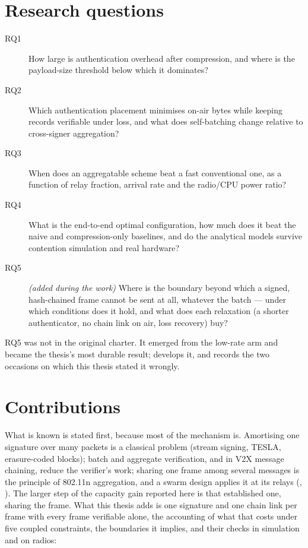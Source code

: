 \section{Research questions}

\begin{description}
\item[RQ1] How large is authentication overhead after compression, and where is the payload-size
      threshold below which it dominates?
\item[RQ2] Which authentication placement minimises on-air bytes while keeping records verifiable
      under loss, and what does self-batching change relative to cross-signer aggregation?
\item[RQ3] When does an aggregatable scheme beat a fast conventional one, as a function of relay
      fraction, arrival rate and the radio/CPU power ratio?
\item[RQ4] What is the end-to-end optimal configuration, how much does it beat the naive and
      compression-only baselines, and do the analytical models survive contention simulation and
      real hardware?
\item[RQ5] \emph{(added during the work)} Where is the boundary beyond which a signed,
      hash-chained frame cannot be sent at all, whatever the batch --- under which conditions
      does it hold, and what does each relaxation (a shorter authenticator, no chain link on
      air, loss recovery) buy?
\end{description}

RQ5 was not in the original charter. It emerged from the low-rate arm and became the thesis's most
durable result;  develops it, and records the two occasions on which this thesis
stated it wrongly.

\section{Contributions}

What is known is stated first, because most of the mechanism is. Amortising one signature over
many packets is a classical problem (stream signing, TESLA, erasure-coded blocks); batch and
aggregate verification, and in V2X message chaining, reduce the verifier's work; sharing one frame
among several messages is the principle of 802.11n aggregation, and a swarm design applies it at
its relays (, ). The larger step of the capacity gain
reported here is that established one, sharing the frame. What this thesis adds is one signature
and one chain link per frame with every frame verifiable alone, the accounting of what that costs
under five coupled constraints, the boundaries it implies, and their checks in simulation and on
radios:

